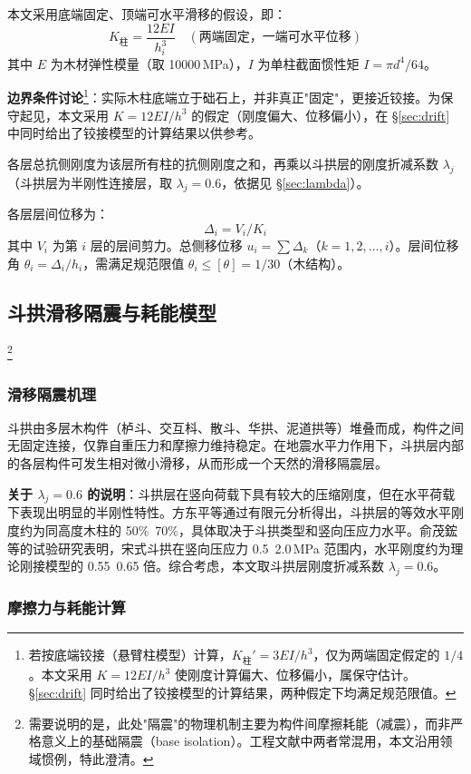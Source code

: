 \documentclass[12pt,a4paper,UTF8]{ctexart}
\begin{document}
本文采用底端固定、顶端可水平滑移的假设，即：
\[
    K_{\text{柱}} = \frac{12 E I}{h_i^3} \quad (\text{两端固定，一端可水平位移})
\]
其中 $E$ 为木材弹性模量（取 10000\,MPa），$I$ 为单柱截面惯性矩 $I = \pi d^4 / 64$。

\textbf{边界条件讨论}\label{sec:boundary}\footnote{若按底端铰接（悬臂柱模型）计算，$K_{\text{柱}}' = 3EI/h^3$，仅为两端固定假定的 $1/4$。本文采用 $K = 12EI/h^3$ 使刚度计算偏大、位移偏小，属保守估计。§\ref{sec:drift} 同时给出了铰接模型的计算结果，两种假定下均满足规范限值。}：实际木柱底端立于础石上，并非真正"固定"，更接近铰接。为保守起见，本文采用 $K = 12EI/h^3$ 的假定（刚度偏大、位移偏小），在 §\ref{sec:drift} 中同时给出了铰接模型的计算结果以供参考。

各层总抗侧刚度为该层所有柱的抗侧刚度之和，再乘以斗拱层的刚度折减系数 $\lambda_j$（斗拱层为半刚性连接层，取 $\lambda_j = 0.6$，依据见 §\ref{sec:lambda}）。

各层层间位移为：
\[
    \Delta_i = V_i / K_i
\]
其中 $V_i$ 为第 $i$ 层的层间剪力。总侧移位移 $u_i = \sum \Delta_k$（$k = 1, 2, \dots, i$）。层间位移角 $\theta_i = \Delta_i / h_i$，需满足规范限值 $\theta_i \leq [\theta] = 1/30$（木结构）。

\subsection{斗拱滑移隔震与耗能模型}\footnote{需要说明的是，此处"隔震"的物理机制主要为构件间摩擦耗能（减震），而非严格意义上的基础隔震（base isolation）。工程文献中两者常混用，本文沿用领域惯例，特此澄清。}

\subsubsection{滑移隔震机理}

斗拱由多层木构件（栌斗、交互枓、散斗、华拱、泥道拱等）堆叠而成，构件之间无固定连接，仅靠自重压力和摩擦力维持稳定。在地震水平力作用下，斗拱层内部的各层构件可发生相对微小滑移，从而形成一个天然的滑移隔震层。

\label{sec:lambda}
\textbf{关于 $\lambda_j = 0.6$ 的说明}：斗拱层在竖向荷载下具有较大的压缩刚度，但在水平荷载下表现出明显的半刚性特性。方东平等\cite{fang2001}通过有限元分析得出，斗拱层的等效水平刚度约为同高度木柱的 50\%~70\%，具体取决于斗拱类型和竖向压应力水平。俞茂鋐等\cite{yu2000}的试验研究表明，宋式斗拱在竖向压应力 0.5~2.0\,MPa 范围内，水平刚度约为理论刚接模型的 0.55~0.65 倍。综合考虑，本文取斗拱层刚度折减系数 $\lambda_j = 0.6$。

\subsubsection{摩擦力与耗能计算}
\end{document}
